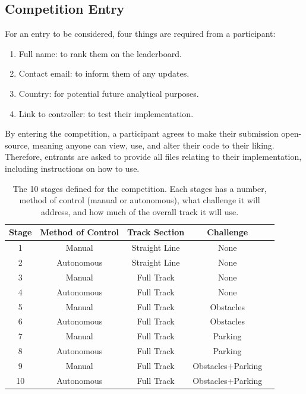 \documentclass{l4proj}
\begin{document}
\subsection{Competition Entry}
For an entry to be considered, four things are required from a participant:
\begin{enumerate}
    \item Full name: to rank them on the leaderboard.
    \item Contact email: to inform them of any updates.
    \item Country: for potential future analytical purposes.
    \item Link to controller: to test their implementation.
\end{enumerate}
By entering the competition, a participant agrees to make their submission open-source, meaning anyone can view, use, and alter their code to their liking. Therefore, entrants are asked to provide all files relating to their implementation, including instructions on how to use.

\begin{table}[]
\caption{The 10 stages defined for the competition. Each stages has a number, method of control (manual or autonomous), what challenge it will address, and how much of the overall track it will use.}
\label{tab:stages}
\begin{tabular}{@{}|c|c|c|c|c|@{}}
\toprule
\multicolumn{1}{|c|}{\textbf{Stage}} & \multicolumn{1}{c|}{\textbf{Method of Control}} & \multicolumn{1}{c|}{\textbf{Track Section}} & \multicolumn{1}{c|}{\textbf{Challenge}} \\ \midrule
1 & Manual & Straight Line & None \\
2 & Autonomous & Straight Line & None \\
3 & Manual & Full Track & None \\
4 & Autonomous & Full Track & None \\
5 & Manual & Full Track & Obstacles \\
6 & Autonomous & Full Track & Obstacles \\
7 & Manual & Full Track & Parking \\
8 & Autonomous & Full Track & Parking \\
9 & Manual & Full Track & Obstacles+Parking \\
10 & Autonomous & Full Track & Obstacles+Parking \\
\bottomrule
\end{tabular}
\end{table}
\end{document}
